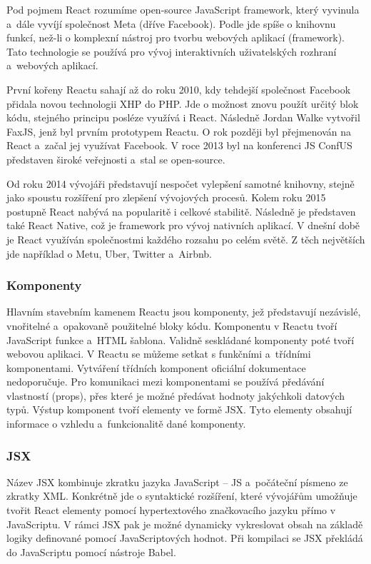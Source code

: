 Pod pojmem React rozumíme open-source JavaScript framework, který vyvinula a~dále vyvíjí společnost Meta (dříve Facebook). 
Podle \cite{reactbanks} jde spíše o knihovnu funkcí, než-li o komplexní nástroj pro tvorbu webových aplikací (framework). 
Tato technologie se používá pro vývoj interaktivních uživatelských rozhraní a~webových aplikací.\cite{reacthubspot}

První kořeny Reactu sahají až do roku 2010, kdy tehdejší společnost Facebook přidala novou technologii XHP do PHP. 
Jde o možnost znovu použít určitý blok kódu, stejného principu posléze využívá i React. Následně Jordan Walke vytvořil FaxJS, jenž byl prvním prototypem Reactu.
O rok později byl přejmenován na React a~začal jej využívat Facebook. 
V roce 2013 byl na konferenci JS ConfUS představen široké veřejnosti a~stal se open-source.

Od roku 2014 vývojáři představují nespočet vylepšení samotné knihovny, stejně jako spoustu rozšíření pro zlepšení vývojových procesů. 
Kolem roku 2015 postupně React nabývá na popularitě i celkové stabilitě. Následně je představen také React Native, což je framework pro vývoj nativních aplikací.
V dnešní době je React využíván společnostmi každého rozsahu po celém světě. 
Z těch největších jde například o Metu, Uber, Twitter a~Airbnb.\cite{reactbanks,reactrisingstack}

\subsubsection{Komponenty}

Hlavním stavebním kamenem Reactu jsou komponenty, jež představují nezávislé, vnořitelné a~opakovaně použitelné bloky kódu. 
Komponentu v Reactu tvoří JavaScript funkce a~HTML šablona. Validně seskládané komponenty poté tvoří webovou aplikaci.
V Reactu se můžeme setkat s funkčními a~třídními komponentami. Vytváření třídních komponent oficiální dokumentace nedoporučuje.
Pro komunikaci mezi komponentami se používá předávání vlastností (props), přes které je možné předávat hodnoty jakýchkoli datových typů.
Výstup komponent tvoří elementy ve formě JSX. Tyto elementy obsahují informace o vzhledu a~funkcionalitě dané komponenty.\cite{reactbanks,react}

\subsubsection{JSX}

Název JSX kombinuje zkratku jazyka JavaScript -- JS a~počáteční písmeno ze zkratky XML. 
Konkrétně jde o syntaktické rozšíření, které vývojářům umožňuje tvořit React elementy pomocí hypertextového značkovacího jazyku přímo v JavaScriptu. 
V rámci JSX pak je možné dynamicky vykreslovat obsah na základě logiky definované pomocí JavaScriptových hodnot.
Při kompilaci se JSX překládá do JavaScriptu pomocí nástroje Babel.\cite{reactbanks,react}

